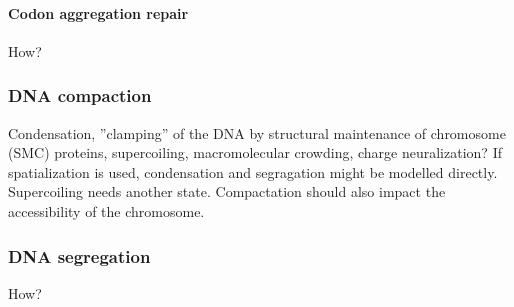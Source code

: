 \paragraph{Codon aggregation repair}
\textcolor[rgb]{1.00,0.00,0.00}{How?}


\subsubsection{DNA compaction}
\textcolor[rgb]{1.00,0.00,0.00}{Condensation, ”clamping” of the DNA by structural maintenance of chromosome (SMC) proteins, supercoiling, macromolecular crowding, charge neuralization?}
If spatialization is used, condensation and segragation might be modelled directly. Supercoiling needs another state.
\textcolor[rgb]{1.00,0.00,0.00}{Compactation should also impact the accessibility of the chromosome.}

\subsubsection{DNA segregation}
\textcolor[rgb]{1.00,0.00,0.00}{How?}
